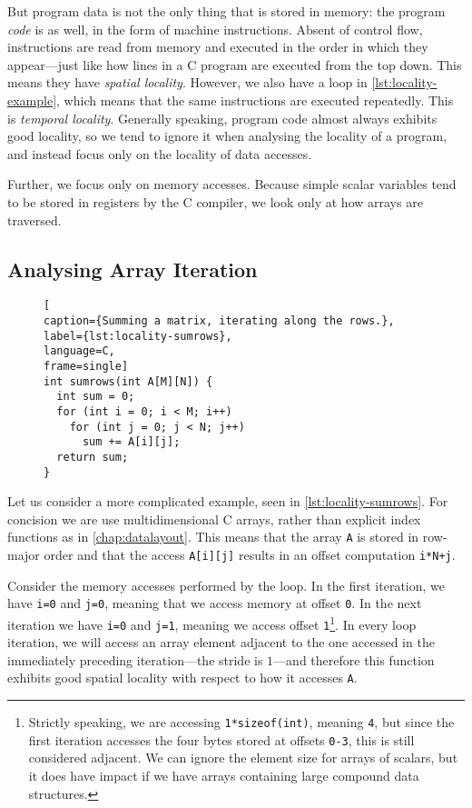 But program data is not the only thing that is stored in memory: the
program \emph{code} is as well, in the form of machine instructions.
Absent of control flow, instructions are read from memory and executed
in the order in which they appear---just like how lines in a C program
are executed from the top down.  This means they have \emph{spatial
  locality}.  However, we also have a loop in
\cref{lst:locality-example}, which means that the same instructions
are executed repeatedly.  This is \emph{temporal locality}.  Generally
speaking, program code almost always exhibits good locality, so we
tend to ignore it when analysing the locality of a program, and
instead focus only on the locality of data accesses.

Further, we focus only on memory accesses.  Because simple scalar
variables tend to be stored in registers by the C compiler, we look
only at how arrays are traversed.

\subsection{Analysing Array Iteration}

\begin{figure}
\begin{lstlisting}[
caption={Summing a matrix, iterating along the rows.},
label={lst:locality-sumrows},
language=C,
frame=single]
int sumrows(int A[M][N]) {
  int sum = 0;
  for (int i = 0; i < M; i++)
    for (int j = 0; j < N; j++)
      sum += A[i][j];
  return sum;
}
\end{lstlisting}
\end{figure}

Let us consider a more complicated example, seen in
\cref{lst:locality-sumrows}.  For concision we are use
multidimensional C arrays, rather than explicit index functions as in
\cref{chap:datalayout}.  This means that the array \texttt{A} is
stored in row-major order and that the access \texttt{A[i][j]} results
in an offset computation \texttt{i*N+j}.

Consider the memory accesses performed by the loop.  In the first
iteration, we have \texttt{i=0} and \texttt{j=0}, meaning that we
access memory at offset \texttt{0}.  In the next iteration we have
\texttt{i=0} and \texttt{j=1}, meaning we access offset
\texttt{1}\footnote{Strictly speaking, we are accessing
  \texttt{1*sizeof(int)}, meaning \texttt{4}, but since the first
  iteration accesses the four bytes stored at offsets \texttt{0-3},
  this is still considered adjacent.  We can ignore the element size
  for arrays of scalars, but it does have impact if we have arrays
  containing large compound data structures.}.  In every loop
iteration, we will access an array element adjacent to the one
accessed in the immediately preceding iteration---the stride is
$1$---and therefore this function exhibits good spatial locality with
respect to how it accesses \texttt{A}.


